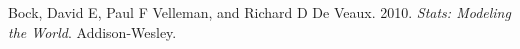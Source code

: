 \documentclass[12pt,reqno,oneside,pdftex]{formato-puc/puctesis} %
\begin{document}
\hypertarget{refs}{}
\leavevmode\hypertarget{ref-bock2010stats}{}%
Bock, David E, Paul F Velleman, and Richard D De Veaux. 2010.
\emph{Stats: Modeling the World}. Addison-Wesley.




\cleardoublepage
\nocite{*} %
 








\end{document}

